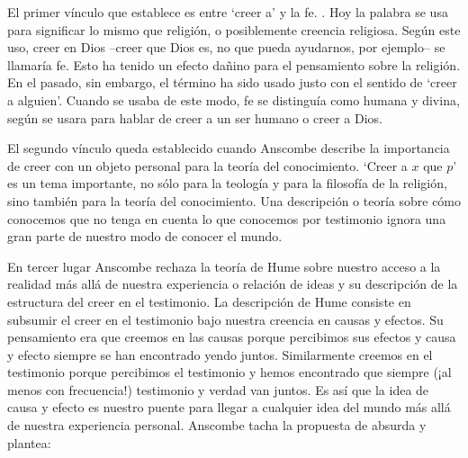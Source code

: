 El primer vínculo que establece es entre `creer a' y la fe. . Hoy la palabra se usa para significar lo mismo que religión, o
posiblemente creencia religiosa. Según este uso, creer en Dios --creer que Dios
es, no que pueda ayudarnos, por ejemplo-- se llamaría fe. Esto ha tenido un
efecto dañino para el pensamiento sobre la religión. En el pasado, sin embargo,
el término ha sido usado justo con el sentido de `creer a alguien'. Cuando se
usaba de este modo, fe se distinguía como humana y divina, según se usara para
hablar de creer a un ser humano o creer a Dios.

El segundo vínculo queda establecido cuando Anscombe describe la importancia de
creer con un objeto personal para la teoría del conocimiento. `Creer a $x$ que
$p$' es un tema importante, no sólo para la teología y para la filosofía de la
religión, sino también para la teoría del conocimiento. Una descripción o teoría
sobre cómo conocemos que no tenga en cuenta lo que conocemos por testimonio
ignora una gran parte de nuestro modo de conocer el mundo. 

En tercer lugar Anscombe rechaza la teoría de Hume sobre nuestro acceso a la
realidad más allá de nuestra experiencia o relación de ideas y su descripción de
la estructura del creer en el testimonio. La descripción de Hume consiste en
subsumir el creer en el testimonio bajo nuestra creencia en causas y efectos. Su
pensamiento era que creemos en las causas porque percibimos sus efectos y causa
y efecto siempre se han encontrado yendo juntos. Similarmente creemos en el
testimonio porque percibimos el testimonio y hemos encontrado que siempre (¡al
menos con frecuencia!) testimonio y verdad van juntos. Es así que la idea de
causa y efecto es nuestro puente para llegar a cualquier idea del mundo más allá
de nuestra experiencia personal. Anscombe tacha la propuesta de absurda y
plantea: 

